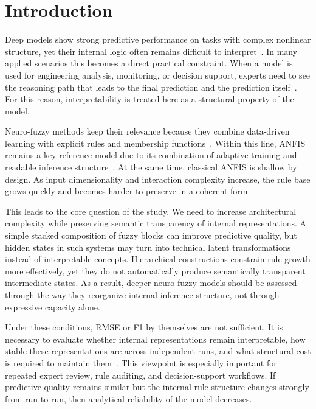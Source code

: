 \documentclass[runningheads]{llncs}
\begin{document}
\section{Introduction}

Deep models show strong predictive performance on tasks with complex nonlinear structure, yet their internal logic often remains difficult to interpret~\cite{lecun2015deep}. In many applied scenarios this becomes a direct practical constraint. When a model is used for engineering analysis, monitoring, or decision support, experts need to see the reasoning path that leads to the final prediction and the prediction itself~\cite{rudin2019stop}. For this reason, interpretability is treated here as a structural property of the model.

Neuro-fuzzy methods keep their relevance because they combine data-driven learning with explicit rules and membership functions~\cite{jang1993anfis,mitra2000neurofuzzy}. Within this line, ANFIS remains a key reference model due to its combination of adaptive training and readable inference structure~\cite{jang1993anfis}. At the same time, classical ANFIS is shallow by design. As input dimensionality and interaction complexity increase, the rule base grows quickly and becomes harder to preserve in a coherent form~\cite{mitra2000neurofuzzy,magdalena2019semantic}.

This leads to the core question of the study. We need to increase architectural complexity while preserving semantic transparency of internal representations. A simple stacked composition of fuzzy blocks can improve predictive quality, but hidden states in such systems may turn into technical latent transformations instead of interpretable concepts. Hierarchical constructions constrain rule growth more effectively, yet they do not automatically produce semantically transparent intermediate states. As a result, deeper neuro-fuzzy models should be assessed through the way they reorganize internal inference structure, not through expressive capacity alone.

Under these conditions, RMSE or F1 by themselves are not sufficient. It is necessary to evaluate whether internal representations remain interpretable, how stable these representations are across independent runs, and what structural cost is required to maintain them~\cite{rudin2019stop,zeng2019deep,feng2020highly,alvarez2018self,koh2020concept,chen2019looks,chen2020concept}. This viewpoint is especially important for repeated expert review, rule auditing, and decision-support workflows. If predictive quality remains similar but the internal rule structure changes strongly from run to run, then analytical reliability of the model decreases.
\end{document}
